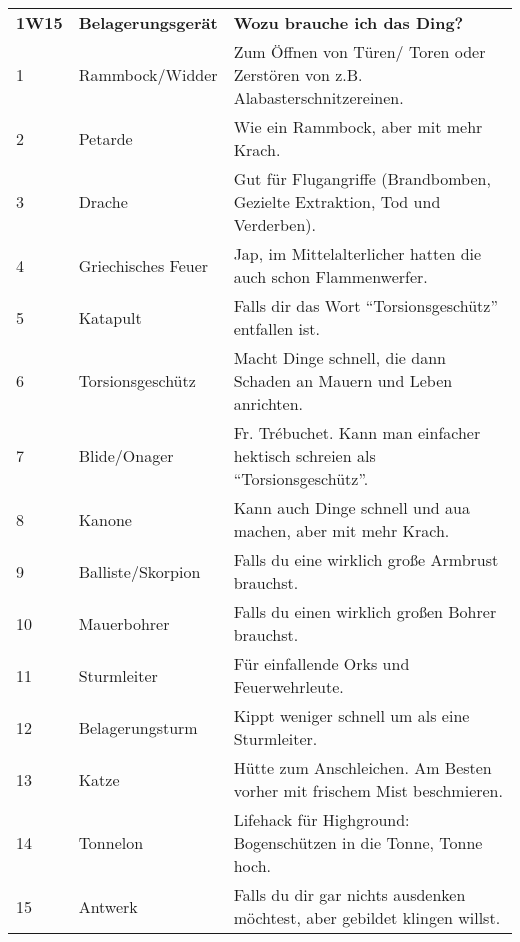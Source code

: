 \documentclass[final]{multiversum}
\begin{document}
\begin{table*}[!t]
      \vspace*{-7mm}
      \begin{framed}
      \begin{tabular}{p{}p{}p{}}
      \textbf{1W15} & \textbf{Belagerungsgerät} & \textbf{Wozu brauche ich das Ding?}\\
      1             & Rammbock/Widder           & Zum Öffnen von Türen/ Toren oder Zerstören von z.B. Alabasterschnitzereinen. \\
      2             & Petarde                   & Wie ein Rammbock, aber mit mehr Krach.\\
      3             & Drache                    & Gut für Flugangriffe (Brandbomben, Gezielte Extraktion, Tod und Verderben).\\
      4             & Griechisches Feuer        & Jap, im Mittelalterlicher hatten die auch schon Flammenwerfer.\\
      5             & Katapult                  & Falls dir das Wort \enquote{Torsionsgeschütz} entfallen ist.\\
      6             & Torsionsgeschütz          & Macht Dinge schnell, die dann Schaden an Mauern und Leben anrichten.\\
      7             & Blide/Onager              & Fr. Trébuchet. Kann man einfacher hektisch schreien als \enquote{Torsionsgeschütz}.\\
      8             & Kanone                    & Kann auch Dinge schnell und aua machen, aber mit mehr Krach.\\
      9             & Balliste/Skorpion         & Falls du eine wirklich große Armbrust brauchst.\\
      10            & Mauerbohrer               & Falls du einen wirklich großen Bohrer brauchst.\\
      11            & Sturmleiter               & Für einfallende Orks und Feuerwehrleute.\\
      12            & Belagerungsturm           & Kippt weniger schnell um als eine Sturmleiter.\\
      13            & Katze                     & Hütte zum Anschleichen. Am Besten vorher mit frischem Mist beschmieren.\\
      14            & Tonnelon                  & Lifehack für Highground: Bogenschützen in die Tonne, Tonne hoch.\\
      15            & Antwerk                   & Falls du dir gar nichts ausdenken möchtest, aber gebildet klingen willst.\\

      \end{tabular}
      \end{framed}
      \end{table*}
\end{document}
